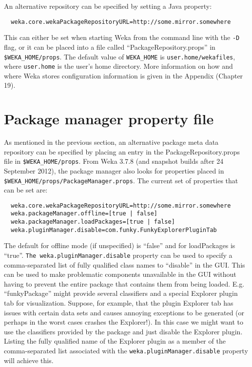 An alternative repository can be specified by setting a Java property:

{\scriptsize
\begin{verbatim}
  weka.core.wekaPackageRepositoryURL=http://some.mirror.somewhere
\end{verbatim}}

This can either be set when starting Weka from the command line with
the \texttt{-D} flag, or it can be placed into a file called
``PackageRepository.props'' in \verb=$WEKA_HOME/props=. The default
value of \verb=WEKA_HOME= is \verb=user.home/wekafiles=, where
\verb=user.home= is the user's home directory. More information on how
and where Weka stores configuration information is given in the
Appendix (Chapter 19).

\section{Package manager property file}

As mentioned in the previous section, an alternative package meta data
repository can be specified by placing an entry in the
PackageRepository.props file in \verb=$WEKA_HOME/props=. From Weka 3.7.8 (and
snapshot builds after 24 September 2012), the package manager also
looks for properties placed in
\verb=$WEKA_HOME/props/PackageManager.props=. The current set of properties
that can be set are:

{\scriptsize
\begin{verbatim}
  weka.core.wekaPackageRepositoryURL=http://some.mirror.somewhere
  weka.packageManager.offline=[true | false]
  weka.packageManager.loadPackages=[true | false]
  weka.pluginManager.disable=com.funky.FunkyExplorerPluginTab
\end{verbatim}}

The default for offline mode (if unspecified) is ``false'' and for
loadPackages is ``true''. \verb=The weka.pluginManager.disable= property can
be used to specify a comma-separated list of fully qualified class
names to ``disable'' in the GUI. This can be used to make problematic
components unavailable in the GUI without having to prevent the entire
package that contains them from being loaded. E.g. ``funkyPackage''
might provide several classifiers and a special Explorer plugin tab
for visualization. Suppose, for example, that the plugin Explorer tab
has issues with certain data sets and causes annoying exceptions to be
generated (or perhaps in the worst cases crashes the Explorer!). In
this case we might want to use the classifiers provided by the package
and just disable the Explorer plugin. Listing the fully qualified name
of the Explorer plugin as a member of the comma-separated list
associated with the \verb=weka.pluginManager.disable= property will achieve
this.

